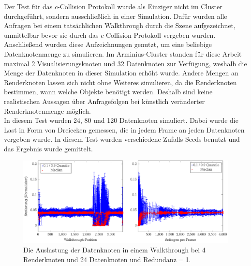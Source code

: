 Der Test für das $c$-Collision Protokoll wurde als Einziger nicht im Cluster durchgeführt, sondern ausschließlich in einer Simulation. Dafür wurden alle Anfragen bei einem tatsächlichen Walkthrough durch die Szene aufgezeichnet, unmittelbar bevor sie durch das $c$-Collision Protokoll vergeben wurden. Anschließend wurden diese Aufzeichnungen genutzt, um eine beliebige Datenknotenmenge zu simulieren. Im Arminius-Cluster standen für diese Arbeit maximal 2 Visualisierungsknoten und 32 Datenknoten zur Verfügung, weshalb die Menge der Datenknoten in dieser Simulation erhöht wurde. Andere Mengen an Renderknoten lassen sich nicht ohne Weiteres simulieren, da die Renderknoten bestimmen, wann welche Objekte benötigt werden. Deshalb sind keine realistischen Aussagen über Anfragefolgen bei künstlich veränderter Renderknotenmenge möglich.\\
In diesem Test wurden 24, 80 und 120 Datenknoten simuliert. Dabei wurde die Last in Form von Dreiecken gemessen, die in jedem Frame an jeden Datenknoten vergeben wurde. In diesem Test wurden verschiedene Zufalls-Seeds benutzt und das Ergebnis wurde gemittelt.
\begin{figure}
\centering
\includegraphics[scale=0.75]{images/diag_cCol_red1_render4_data24_2x.pdf}
  \caption{\label{fig:eval:cCol1}Die Auslastung der Datenknoten in einem Walkthrough bei 4 Renderknoten und 24 Datenknoten und Redundanz$=$1.}
\end{figure}

